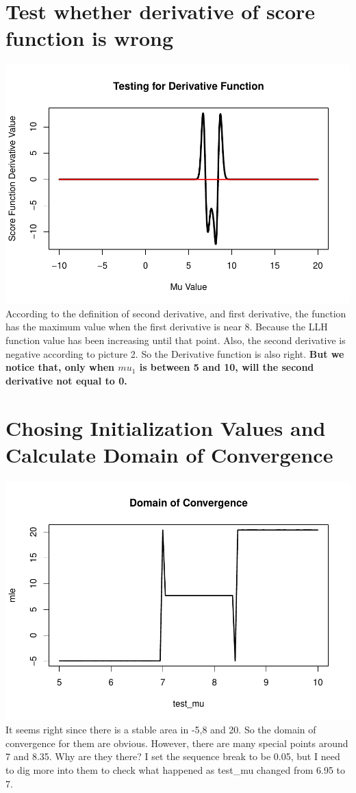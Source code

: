 \documentclass[12pt]{article}
\begin{document}
\section{Test whether derivative of score function is wrong}

\includegraphics{Mixed_Normal_MLE_files/figure-latex/unnamed-chunk-3-1.pdf}
According to the definition of second derivative, and first derivative,
the function has the maximum value when the first derivative is near 8.
Because the LLH function value has been increasing until that point.
Also, the second derivative is negative according to picture 2. So the
Derivative function is also right. \textbf{But we notice that, only when
\(mu_1\) is between 5 and 10, will the second derivative not equal to
0.}

\section{Chosing Initialization Values and Calculate Domain of Convergence}

\includegraphics{Mixed_Normal_MLE_files/figure-latex/unnamed-chunk-4-1.pdf}
It seems right since there is a stable area in -5,8 and 20. So the
domain of convergence for them are obvious. However, there are many
special points around 7 and 8.35. Why are they there? I set the sequence
break to be 0.05, but I need to dig more into them to check what
happened as test\_mu changed from 6.95 to 7.
\end{document}
